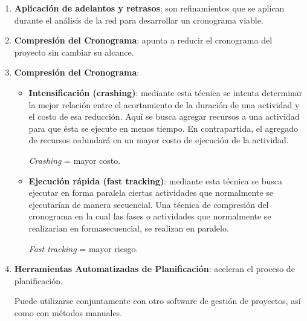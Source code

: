 \documentclass[10pt,a4paper]{article}
\begin{document}
\begin{itemize}
\begin{itemize}
\begin{enumerate}
\item \textbf{Aplicación de adelantos y retrasos}: son refinamientos que se aplican durante el análisis de la red para desarrollar un cronograma viable.

\item \textbf{Compresión del Cronograma}: apunta a reducir el cronograma del proyecto sin cambiar su alcance.

\item \textbf{Compresión del Cronograma}:
\begin{itemize}
\item \textbf{Intensificación (crashing)}: mediante esta técnica se intenta
determinar la mejor relación entre el acortamiento de la duración de una actividad y el costo de esa reducción. Aquí se busca agregar recursos a una actividad para que ésta se ejecute en menos tiempo. En contrapartida, el agregado de recursos redundará en un mayor costo de ejecución de la actividad.
\begin{center} \textit{Crashing} = mayor costo. \end{center}
\item \textbf{Ejecución rápida (fast tracking)}: mediante esta técnica se busca ejecutar en forma paralela ciertas actividades que normalmente se ejecutarían de manera secuencial. Una técnica de compresión del cronograma en la cual las fases o actividades que normalmente se realizarían en formasecuencial, se realizan en  paralelo.
\begin{center} \textit{Fast tracking} = mayor riesgo. \end{center}
\end{itemize}

\item \textbf{Herramientas Automatizadas de Planificación}: aceleran el proceso de planificación.

Puede utilizarse conjuntamente con otro software de gestión de proyectos, así como con métodos manuales.
\end{enumerate}


\end{itemize}
\end{itemize}
\end{document}
